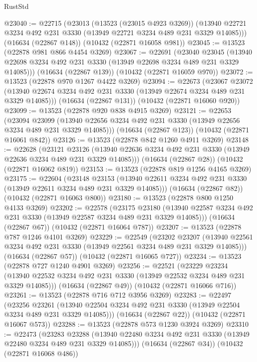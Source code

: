 \begin{lexlean}{RustStd}
\begin{coremodule}
@23040 := @22715
    (@23013
      (@13523 (@23015 @4923 @3269))
      (@13940 @22721 @3234 @492 @231 @3330 (@13949 @22721 @3234 @489 @231 @3329 @14085)))
    (@16634 (@22867 @148))
    (@10432 (@22871 @16058 @981))
@23045 := @13523 (@22878 @981 @866 @4454 @3269)
@23067 := @22691
    (@23040
      @23045
      (@13940 @22698 @3234 @492 @231 @3330 (@13949 @22698 @3234 @489 @231 @3329 @14085)))
    (@16634 (@22867 @139))
    (@10432 (@22871 @16059 @970))
@23072 := @13523 (@22878 @970 @1267 @4422 @3269)
@23094 := @22673
    (@23067
      @23072
      (@13940 @22674 @3234 @492 @231 @3330 (@13949 @22674 @3234 @489 @231 @3329 @14085)))
    (@16634 (@22867 @131))
    (@10432 (@22871 @16060 @920))
@23099 := @13523 (@22878 @920 @838 @4915 @3269)
@23121 := @22653
    (@23094
      @23099
      (@13940 @22656 @3234 @492 @231 @3330 (@13949 @22656 @3234 @489 @231 @3329 @14085)))
    (@16634 (@22867 @123))
    (@10432 (@22871 @16061 @842))
@23126 := @13523 (@22878 @842 @1260 @4911 @3269)
@23148 := @22628
    (@23121
      @23126
      (@13940 @22636 @3234 @492 @231 @3330 (@13949 @22636 @3234 @489 @231 @3329 @14085)))
    (@16634 (@22867 @28))
    (@10432 (@22871 @16062 @819))
@23153 := @13523 (@22878 @819 @1256 @4165 @3269)
@23175 := @22604
    (@23148
      @23153
      (@13940 @22611 @3234 @492 @231 @3330 (@13949 @22611 @3234 @489 @231 @3329 @14085)))
    (@16634 (@22867 @82))
    (@10432 (@22871 @16063 @800))
@23180 := @13523 (@22878 @800 @1250 @4133 @3269)
@23202 := @22578
    (@23175
      @23180
      (@13940 @22587 @3234 @492 @231 @3330 (@13949 @22587 @3234 @489 @231 @3329 @14085)))
    (@16634 (@22867 @67))
    (@10432 (@22871 @16064 @787))
@23207 := @13523 (@22878 @787 @1246 @4101 @3269)
@23229 := @22549
    (@23202
      @23207
      (@13940 @22561 @3234 @492 @231 @3330 (@13949 @22561 @3234 @489 @231 @3329 @14085)))
    (@16634 (@22867 @57))
    (@10432 (@22871 @16065 @727))
@23234 := @13523 (@22878 @727 @1240 @4901 @3269)
@23256 := @22521
    (@23229
      @23234
      (@13940 @22532 @3234 @492 @231 @3330 (@13949 @22532 @3234 @489 @231 @3329 @14085)))
    (@16634 (@22867 @49))
    (@10432 (@22871 @16066 @716))
@23261 := @13523 (@22878 @716 @712 @3956 @3269)
@23283 := @22497
    (@23256
      @23261
      (@13940 @22504 @3234 @492 @231 @3330 (@13949 @22504 @3234 @489 @231 @3329 @14085)))
    (@16634 (@22867 @22))
    (@10432 (@22871 @16067 @573))
@23288 := @13523 (@22878 @573 @1230 @3924 @3269)
@23310 := @22473
    (@23283
      @23288
      (@13940 @22480 @3234 @492 @231 @3330 (@13949 @22480 @3234 @489 @231 @3329 @14085)))
    (@16634 (@22867 @34))
    (@10432 (@22871 @16068 @486))

\end{coremodule}
\end{lexlean}
